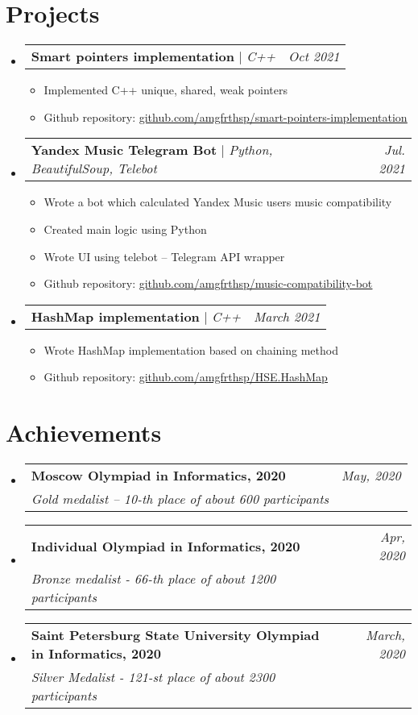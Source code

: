 \documentclass[letterpaper,11pt]{article}
\makeatletter
\newcommand{\resumeItem}[1]{
  \item\small{
    {#1 \vspace{-2pt}}
  }
}
\newcommand{\resumeSubheading}[4]{
  \vspace{-2pt}\item
    \begin{tabular*}{0.97\textwidth}[t]{l@{\extracolsep{\fill}}r}
      #1 & #2 \\
      \textit{\small#3} & \textit{\small #4} \\
    \end{tabular*}\vspace{-7pt}
}
\newcommand{\resumeProjectHeading}[2]{
    \item
    \begin{tabular*}{0.97\textwidth}{l@{\extracolsep{\fill}}r}
      #1 & \textit{\small #2} \\
    \end{tabular*}\vspace{-7pt}
}
\newcommand{\resumeSubHeadingListStart}{\begin{itemize}[leftmargin=0.15in, label={}]}
\newcommand{\resumeSubHeadingListEnd}{\end{itemize}}
\newcommand{\resumeItemListStart}{\begin{itemize}}
\newcommand{\resumeItemListEnd}{\end{itemize}\vspace{-5pt}}
\makeatother
\begin{document}
\section{Projects}
    \resumeSubHeadingListStart
    \resumeProjectHeading
          {\textbf{Smart pointers implementation} $|$ \emph{C++}}{Oct 2021}
          \resumeItemListStart
            \resumeItem{Implemented C++ unique, shared, weak pointers}
            \resumeItem{Github repository: \href{https://github.com/amgfrthsp/smart-pointers-implementation}{\underline{github.com/amgfrthsp/smart-pointers-implementation}}}
          \resumeItemListEnd
          
      \resumeProjectHeading
          {\textbf{Yandex Music Telegram Bot} $|$ \emph{Python, BeautifulSoup, Telebot}}{Jul. 2021}
          \resumeItemListStart
            \resumeItem{Wrote a bot which calculated Yandex Music users music compatibility}
            \resumeItem{Created main logic using Python}
            \resumeItem{Wrote UI using telebot -- Telegram API wrapper}
            \resumeItem{Github repository: \href{https://github.com/amgfrthsp/music-compatibility-bot}{\underline{github.com/amgfrthsp/music-compatibility-bot}}}
          \resumeItemListEnd
          
      \resumeProjectHeading
          {\textbf{HashMap implementation} $|$ \emph{C++}}{March 2021}
          \resumeItemListStart
            \resumeItem{Wrote HashMap implementation based on chaining method}
            \resumeItem{Github repository: \href{https://github.com/amgfrthsp/HSE.HashMap}{\underline{github.com/amgfrthsp/HSE.HashMap}}}
          \resumeItemListEnd
    \resumeSubHeadingListEnd      
    

\section{Achievements}
  \resumeSubHeadingListStart
    \resumeSubheading
      {\textbf{Moscow Olympiad in Informatics, 2020}}{\emph{May, 2020}}
      {Gold medalist – 10-th place of about 600 participants}{}
    \resumeSubheading
      {\textbf{Individual Olympiad in Informatics, 2020}}{\emph{Apr, 2020}}
      {Bronze medalist - 66-th place of about 1200 participants}{}
    \resumeSubheading
      {\textbf{Saint Petersburg State University Olympiad in Informatics, 2020}}{\emph{March, 2020}}
      {Silver Medalist - 121-st place of about 2300 participants}{}
  \resumeSubHeadingListEnd

%
\end{document}
